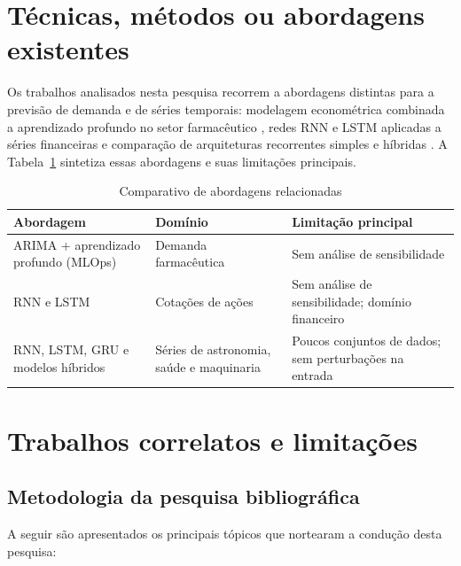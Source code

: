 \documentclass[
    12pt,
    openright,
    oneside,
    a4paper,
    english,
    brazil
]{abntex2}
\begin{document}
\section{Técnicas, métodos ou abordagens existentes}
\label{sec:tecnicas_existentes}

Os trabalhos analisados nesta pesquisa recorrem a abordagens distintas para a previsão de demanda e de séries temporais: modelagem econométrica combinada a aprendizado profundo no setor farmacêutico \cite{SIERRAESPINEL20252791}, redes RNN e LSTM aplicadas a séries financeiras \cite{AGARWAL2024979} e comparação de arquiteturas recorrentes simples e híbridas \cite{YUNITA2025103462}. A Tabela~\ref{tab:abordagens} sintetiza essas abordagens e suas limitações principais.

\begin{table}[htb]
  \centering
  \caption{Comparativo de abordagens relacionadas}
  \label{tab:abordagens}
  \begin{tabular}{p{4cm}p{3.6cm}p{5.4cm}}
    \toprule
    Abordagem & Domínio & Limitação principal \\
    \midrule
    ARIMA + aprendizado profundo (MLOps) & Demanda farmacêutica & Sem análise de sensibilidade \\
    RNN e LSTM & Cotações de ações & Sem análise de sensibilidade; domínio financeiro \\
    RNN, LSTM, GRU e modelos híbridos & Séries de astronomia, saúde e maquinaria & Poucos conjuntos de dados; sem perturbações na entrada \\
    \bottomrule
  \end{tabular}
\end{table}

\section{Trabalhos correlatos e limitações}
\label{sec:trabalhos_relacionados}

\subsection{Metodologia da pesquisa bibliográfica}
\label{sec:metodologia_pesquisa}

A seguir são apresentados os principais tópicos que nortearam a condução desta pesquisa:
\end{document}
